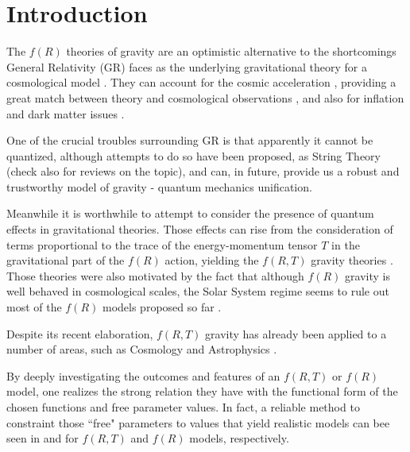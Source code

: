 
\section{Introduction}

\label{sec:int}

The $f(R)$ theories of gravity \cite%
{capozziello/2005,nojiri/2006,nojiri/2008} are an optimistic alternative to
the shortcomings General Relativity (GR) faces as the underlying
gravitational theory for a cosmological model \cite%
{sola/2015,padmanabhan/2003,jamil/2009}. They can account for the cosmic
acceleration \cite{riess/1998,perlmutter/1999}, providing a great match
between theory and cosmological observations \cite%
{amarzguioui/2006,tsujikawa/2008,fay/2007}, and also for inflation \cite%
{rinaldi/2014,huang/2014,myrzakulov/2015,elizalde/2010,myrzakul/2015,barvinsky/2015,bamba/2015}
and dark matter issues \cite{capozziello/2007,lubini/2011,shojai/2014}.

One of the crucial troubles surrounding GR is that apparently it cannot be
quantized, although attempts to do so have been proposed, as String Theory 
\cite{fradkin/1985,witten/1986,friedan/1986} (check also \cite%
{barbon/2004,brink/2004} for reviews on the topic), and can, in future,
provide us a robust and trustworthy model of gravity - quantum mechanics
unification.

Meanwhile it is worthwhile to attempt to consider the presence of quantum
effects in gravitational theories. Those effects can rise from the
consideration of terms proportional to the trace of the energy-momentum
tensor $T$ in the gravitational part of the $f(R)$ action, yielding the $%
f(R,T)$ gravity theories \cite{harko/2011}. Those theories were also
motivated by the fact that although $f(R)$ gravity is well behaved in
cosmological scales, the Solar System regime seems to rule out most of the $%
f(R)$ models proposed so far \cite%
{erickcek/2006,chiba/2007,capozziello/2007b,olmo/2007}.

Despite its recent elaboration, $f(R,T)$ gravity has already been applied to
a number of areas, such as Cosmology \cite%
{mc/2016,ms/2016,mrc/2016,moraes/2015,moraes/2014,moraes/2016,jamil/2012,singh/2014,farasat_shamir/2015,sahoo/2014,rudra/2015,sharif/2013,reddy/2014,sahoo/2016,houndjo/2014}
and Astrophysics \cite%
{mmm/2016,mam/2016,amam/2016,zubair/2015,noureen/2015,noureen/2015b}.

By deeply investigating the outcomes and features of an $f(R,T)$ or $f(R)$
model, one realizes the strong relation they have with the functional form
of the chosen functions and free parameter values. In fact, a reliable
method to constraint those ``free" parameters to values that yield realistic
models can bee seen in \cite{cm/2016} and \cite{cmsdr/2015} for $f(R,T)$ and 
$f(R)$ models, respectively.

